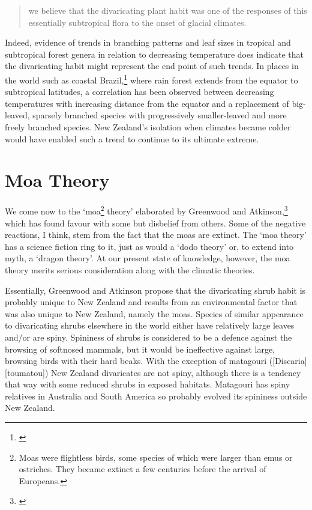 \begin{quote}
	we believe that the divaricating plant habit was one of the responses of this essentially subtropical flora to the onset of glacial climates.
\end{quote}

Indeed, evidence of trends in branching patterns and leaf sizes in tropical and subtropical forest genera in relation to decreasing temperature does indicate that the divaricating habit might represent the end point of such trends.
In places in the world such as coastal Brazil,\footnote{\cite{cain1956applications}} where rain forest extends from the equator to subtropical latitudes, a correlation has been observed between decreasing temperatures with increasing distance from the equator and a replacement of big-leaved, sparsely branched species with progressively smaller-leaved and more freely branched species.
New Zealand's isolation when climates became colder would have enabled such a trend to continue to its ultimate extreme.

\section{Moa Theory}

We come now to the `moa\footnote{Moas were flightless birds, some species of which were larger than emus or ostriches. They became extinct a few centuries before the arrival of Europeans.} theory' elaborated by Greenwood and Atkinson,\footnote{\cite{greenwood1977evolution}} which has found favour with some but disbelief from others.
Some of the negative reactions, I think, stem from the fact that the moas are extinct.
The `moa theory' has a science fiction ring to it, just as would a `dodo theory' or, to extend into myth, a `dragon theory'.
At our present state of knowledge, however, the moa theory merits serious consideration along with the climatic theories.

Essentially, Greenwood and Atkinson propose that the divaricating shrub habit is probably unique to New Zealand and results from an environmental factor that was also unique to New Zealand, namely the moas.
Species of similar appearance to divaricating shrubs elsewhere in the world either have relatively large leaves and/or are spiny.
Spininess of shrubs is considered to be a defence against the browsing of softnosed mammals, but it would be ineffective against large, browsing birds with their hard beaks.
With the exception of matagouri ([Discaria][toumatou]) New Zealand divaricates are not spiny, although there is a tendency that way with some reduced shrubs in exposed habitats.  Matagouri has spiny relatives in Australia and South America so probably evolved its spininess outside New Zealand.

